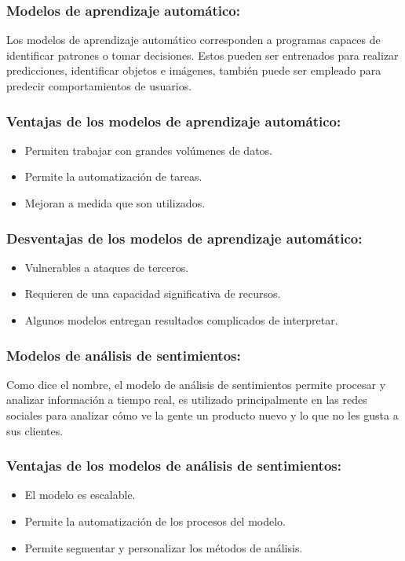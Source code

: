 \subsubsection{Modelos de aprendizaje automático:}
Los modelos de aprendizaje automático corresponden a programas capaces de identificar patrones o tomar decisiones. Estos pueden ser entrenados para realizar predicciones, identificar objetos e imágenes, también puede ser empleado para predecir comportamientos de usuarios.

\subsubsection{Ventajas de los modelos de aprendizaje automático:}
\begin{itemize}
    \item Permiten trabajar con grandes volúmenes de datos.
    \item Permite la automatización de tareas.
    \item Mejoran a medida que son utilizados.
\end{itemize}

\subsubsection{Desventajas de los modelos de aprendizaje automático:}
\begin{itemize}
    \item Vulnerables a ataques de terceros.
    \item Requieren de una capacidad significativa de recursos.
    \item Algunos modelos entregan resultados complicados de interpretar.
\end{itemize}

\subsubsection{Modelos de análisis de sentimientos: }
Como dice el nombre, el modelo de análisis de sentimientos permite procesar y analizar información a tiempo real, es utilizado principalmente en las redes sociales para analizar cómo ve la gente un producto nuevo y lo que no les gusta a sus clientes.

\subsubsection{Ventajas de los modelos de análisis de sentimientos:}
\begin{itemize}
    \item El modelo es escalable.
    \item Permite la automatización de los procesos del modelo.
    \item Permite segmentar y personalizar los métodos de análisis.
\end{itemize}

